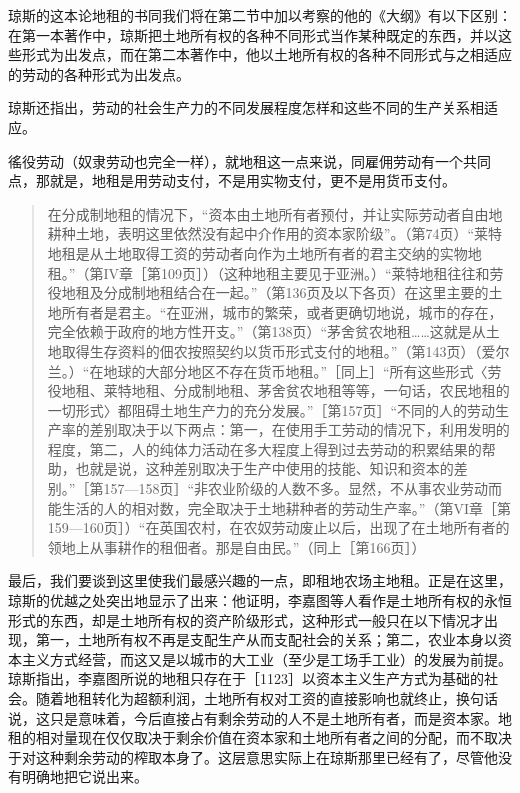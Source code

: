琼斯的这本论地租的书同我们将在第二节中加以考察的他的《大纲》有以下区别：在第一本著作中，琼斯把土地所有权的各种不同形式当作某种既定的东西，并以这些形式为出发点，而在第二本著作中，他以土地所有权的各种不同形式与之相适应的劳动的各种形式为出发点。

琼斯还指出，劳动的社会生产力的不同发展程度怎样和这些不同的生产关系相适应。

徭役劳动（奴隶劳动也完全一样），就地租这一点来说，同雇佣劳动有一个共同点，那就是，地租是用劳动支付，不是用实物支付，更不是用货币支付。

\begin{quote}{在分成制地租的情况下，“资本由土地所有者预付，并让实际劳动者自由地耕种土地，表明这里依然没有起中介作用的资本家阶级”。（第74页）“莱特地租是从土地取得工资的劳动者向作为土地所有者的君主交纳的实物地租。”（第IV章［第109页］）（这种地租主要见于亚洲。）“莱特地租往往和劳役地租及分成制地租结合在一起。”（第136页及以下各页）在这里主要的土地所有者是君主。“在亚洲，城市的繁荣，或者更确切地说，城市的存在，完全依赖于政府的地方性开支。”（第138页）“茅舍贫农地租……这就是从土地取得生存资料的佃农按照契约以货币形式支付的地租。”（第143页）（爱尔兰。）“在地球的大部分地区不存在货币地租。”［同上］“所有这些形式〈劳役地租、莱特地租、分成制地租、茅舍贫农地租等等，一句话，农民地租的一切形式〉都阻碍土地生产力的充分发展。”［第157页］“不同的人的劳动生产率的差别取决于以下两点：第一，在使用手工劳动的情况下，利用发明的程度，第二，人的纯体力活动在多大程度上得到过去劳动的积累结果的帮助，也就是说，这种差别取决于生产中使用的技能、知识和资本的差别。”［第157—158页］“非农业阶级的人数不多。显然，不从事农业劳动而能生活的人的相对数，完全取决于土地耕种者的劳动生产率。”（第VI章［第159—160页］）“在英国农村，在农奴劳动废止以后，出现了在土地所有者的领地上从事耕作的租佃者。那是自由民。”（同上［第166页］）}\end{quote}

最后，我们要谈到这里使我们最感兴趣的一点，即租地农场主地租。正是在这里，琼斯的优越之处突出地显示了出来：他证明，李嘉图等人看作是土地所有权的永恒形式的东西，却是土地所有权的资产阶级形式，这种形式一般只在以下情况才出现，第一，土地所有权不再是支配生产从而支配社会的关系；第二，农业本身以资本主义方式经营，而这又是以城市的大工业（至少是工场手工业）的发展为前提。琼斯指出，李嘉图所说的地租只存在于［1123］以资本主义生产方式为基础的社会。随着地租转化为超额利润，土地所有权对工资的直接影响也就终止，换句话说，这只是意味着，今后直接占有剩余劳动的人不是土地所有者，而是资本家。地租的相对量现在仅仅取决于剩余价值在资本家和土地所有者之间的分配，而不取决于对这种剩余劳动的榨取本身了。这层意思实际上在琼斯那里已经有了，尽管他没有明确地把它说出来。

